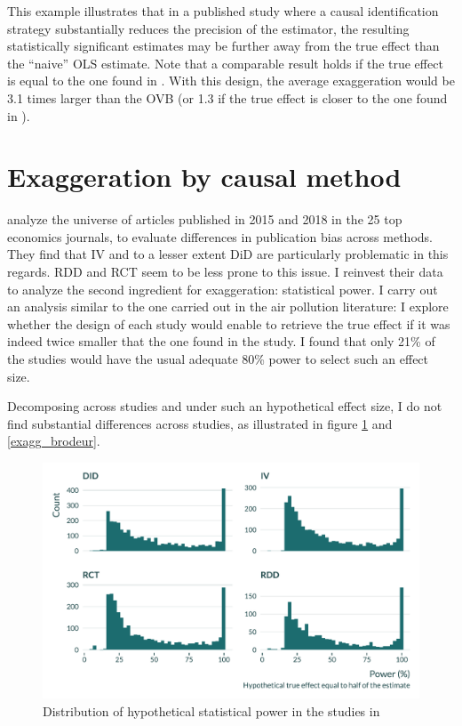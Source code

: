 \documentclass[usletter, 12pt]{article}
\begin{document}
		This example illustrates that in a published study where a causal identification strategy substantially reduces the precision of the estimator, the resulting statistically significant estimates may be further away from the true effect than the ``naive'' OLS estimate. Note that a comparable result holds if the true effect is equal to the one found in \cite{deryugina_mortality_2019}. With this design, the average exaggeration would be 3.1 times larger than the OVB (or 1.3 if the true effect is closer to the one found in \cite{deryugina_mortality_2019}).
							
			
						
			
	\newpage
	

	

\newpage

\appendix

\section{Exaggeration by causal method}\label{brodeur}
	
	\cite{brodeur_methods_2020} analyze the universe of articles published in 2015 and 2018 in the 25 top economics journals, to evaluate differences in publication bias across methods. They find that IV and to a lesser extent DiD are particularly problematic in this regards. RDD and RCT seem to be less prone to this issue. I reinvest their data to analyze the second ingredient for exaggeration: statistical power. I carry out an analysis similar to the one carried out in the air pollution literature:  I explore whether the design of each study would enable to retrieve the true effect if it was indeed twice smaller that the one found in the study. I found that only 21\% of the studies would have the usual adequate 80\% power to select such an effect size.
	
	Decomposing across studies and under such an hypothetical effect size, I do not find substantial differences across studies, as illustrated in figure \ref{power_brodeur} and  \ref{exagg_brodeur}.
	
	  \begin{figure}[h!]
                    \caption{Distribution of hypothetical statistical power in the studies in \cite{brodeur_methods_2020}}
                        \label{power_brodeur}
                    \centering
                    \includegraphics[width=0.8\linewidth]{images/power_brodeur.pdf}
                \end{figure}
                
\end{document}
